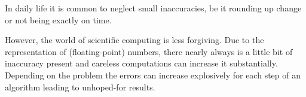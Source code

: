 
In daily life it is common to neglect small inaccuracies, be it rounding up change or not being exactly on time.

However, the world of scientific computing is less forgiving.
Due to the representation of (floating-point) numbers, there nearly always is a little bit of inaccuracy present and careless computations can increase it substantially.
Depending on the problem the errors can increase explosively for each step of an algorithm
leading to unhoped-for results.


